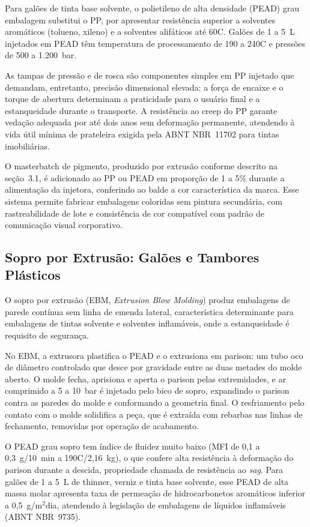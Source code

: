 \documentclass[
  12pt,
  a4paper,
  oneside,
  brazil,
  chapter=TITLE
]{article}
\begin{document}
Para galões de tinta base solvente, o polietileno de alta densidade (PEAD) grau
embalagem substitui o PP, por apresentar resistência superior a solventes
aromáticos (tolueno, xileno) e a solventes alifáticos até 60\textdegree{}C. Galões de 1 a
5~L injetados em PEAD têm temperatura de processamento de 190 a 240\textdegree{}C e pressões
de 500 a 1.200~bar.

As tampas de pressão e de rosca são componentes simples em PP injetado que
demandam, entretanto, precisão dimensional elevada: a força de encaixe e o torque
de abertura determinam a praticidade para o usuário final e a estanqueidade
durante o transporte. A resistência ao creep do PP garante vedação adequada por
até dois anos sem deformação permanente, atendendo à vida útil mínima de
prateleira exigida pela ABNT NBR~11702 para tintas imobiliárias.

O masterbatch de pigmento, produzido por extrusão conforme descrito na
seção~3.1, é adicionado ao PP ou PEAD em proporção de 1 a 5\% durante a
alimentação da injetora, conferindo ao balde a cor característica da marca. Esse
sistema permite fabricar embalagens coloridas sem pintura secundária, com
rastreabilidade de lote e consistência de cor compatível com padrão de
comunicação visual corporativo.

\subsection{Sopro por Extrusão: Galões e Tambores Plásticos}\label{sopro}

O sopro por extrusão (EBM, \textit{Extrusion Blow Molding}) produz embalagens de
parede contínua sem linha de emenda lateral, característica determinante para
embalagens de tintas solvente e solventes inflamáveis, onde a estanqueidade é
requisito de segurança.

No EBM, a extrusora plastifica o PEAD e o extrusiona em parison: um tubo oco de
diâmetro controlado que desce por gravidade entre as duas metades do molde aberto.
O molde fecha, aprisiona e aperta o parison pelas extremidades, e ar comprimido a
5 a 10~bar é injetado pelo bico de sopro, expandindo o parison contra as paredes
do molde e conformando a geometria final. O resfriamento pelo contato com o molde
solidifica a peça, que é extraída com rebarbas nas linhas de fechamento, removidas
por operação de acabamento.

O PEAD grau sopro tem índice de fluidez muito baixo (MFI de 0,1 a 0,3~g/10~min a
190\textdegree{}C/2,16~kg), o que confere alta resistência à deformação do parison durante a
descida, propriedade chamada de resistência ao \textit{sag}. Para galões de 1 a
5~L de thinner, verniz e tinta base solvente, esse PEAD de alta massa molar
apresenta taxa de permeação de hidrocarbonetos aromáticos inferior a
0,5~g/m$^2${\textperiodcentered}dia, atendendo à legislação de embalagens de líquidos inflamáveis
(ABNT NBR~9735).
\end{document}
